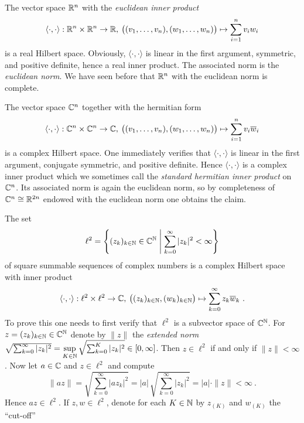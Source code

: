\begin{examples}
\label{ex:inner-product-spaces}
\begin{environmentlist}
\item The vector space $\mathbb{R}^n$ with the \emph{euclidean inner product} 
      \[ 
        \langle \cdot , \cdot \rangle : \mathbb{R}^n \times \mathbb{R}^n \to \mathbb{R}, \:
        \big( (v_1,\ldots , v_n),(w_1,\ldots , w_n) \big) \mapsto 
        \sum_{i=1}^n v_i w_i  
      \]
      is a real Hilbert space. Obviously, $\langle \cdot , \cdot \rangle$ is linear in the first argument,
      symmetric, and positive definite, hence a real inner product. The associated norm is 
      the \emph{euclidean norm}. We have seen before that $\mathbb{R}^n$ with the euclidean norm is complete.      
\item The vector space $\mathbb{C}^n$ together with the hermitian form 
      \[
        \langle \cdot , \cdot \rangle : \mathbb{C}^n \times \mathbb{C}^n \to \mathbb{C}, \:
        \big( (v_1,\ldots , v_n),(w_1,\ldots , w_n) \big) \mapsto 
        \sum_{i=1}^n v_i\overline{w}_i
      \]
      is a complex Hilbert space. One immediately verifies that $\langle \cdot , \cdot \rangle$ is linear in the first argument,
      conjugate symmetric, and positive definite. Hence $\langle \cdot , \cdot \rangle$ is a complex inner product which we 
      sometimes call the \emph{standard hermitian inner product} on $\mathbb{C}^n$.  Its associated norm is again the euclidean 
      norm, so by completeness of $\mathbb{C}^n\cong \mathbb{R}^{2n}$ endowed with the euclidean norm one obtains the claim.      
\item The set 
      \[
        \ell^2 = 
        \left\{(z_k)_{k\in \N} \in \C^\N \suchthat \sum_{k=0}^\infty |z_k|^2 < \infty \right\}
      \]
      of square summable sequences of complex numbers  is a complex Hilbert space 
      with inner product
      \[
        \langle \cdot , \cdot \rangle :
        \ell^2 \times \ell^2 \to \mathbb{C}, \: \big((z_k)_{k\in \mathbb{N}},(w_k)_{k\in \mathbb{N}} \big)
        \mapsto \sum_{k=0}^\infty z_k \overline{w}_k \ .
      \]
      To prove this one needs to first verify that $\ell^2$ is a subvector space of $\mathbb{C}^{\mathbb{N}}$. 
      For $z = (z_k)_{k\in \mathbb{N}} \in \mathbb{C}^{\mathbb{N}}$ denote by $\| z\|$ the \emph{extended norm} 
      $\sqrt{\sum_{k=0}^\infty |z_k|^2} = \sup\limits_{K\in \mathbb{N}} \sqrt{\sum_{k=0}^K |z_k|^2} \in {[ 0,\infty ]}$.
      Then $z\in \ell^2$ if and only if $\|z\| < \infty$. Now let $a \in \mathbb{C}$ and $z\in \ell^2$ and compute
      \[
         \| a z \| = \sqrt{\sum_{k=0}^\infty |a  z_k|^2} = |a| \, \sqrt{\sum_{k=0}^\infty |z_k|^2} = |a| \cdot \| z \| < \infty \ .
      \] 
      Hence $az \in \ell^2$. If $z,w \in \ell^2$, denote for each $K\in \mathbb{N}$ by $z_{(K)}$ and $w_{(K)}$ the ``cut-off'' 

\end{environmentlist}
\end{examples}
